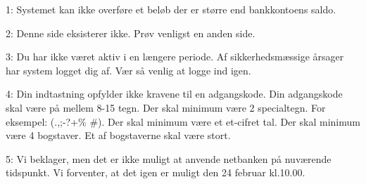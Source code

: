 \documentclass[12pt]{article}
\begin{document}
1: Systemet kan ikke overføre et beløb der er større end bankkontoens saldo.

2: Denne side eksisterer ikke. Prøv venligst en anden side.

3: Du har ikke været aktiv i en længere periode. Af sikkerhedsmæssige årsager har system logget dig af. Vær så venlig at logge ind igen.

4: Din indtastning opfylder ikke kravene til en adgangskode. Din adgangskode skal være på mellem 8-15 tegn. Der skal minimum være 2 specialtegn. For eksempel: (.,;-?+\% \#). Der skal minimum være et et-cifret tal. Der skal minimum være 4 bogstaver. Et af bogstaverne skal være stort.

5: Vi beklager, men det er ikke muligt at anvende netbanken på nuværende tidspunkt. Vi forventer, at det igen er muligt den 24 februar kl.10.00.
\end{document}
